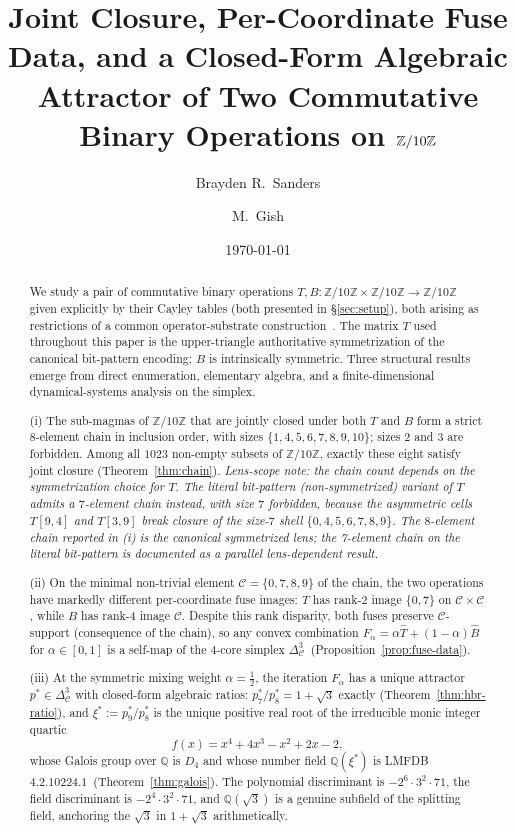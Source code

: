\documentclass[11pt,reqno]{amsart}
\title[Joint closure on $\Zten$]{Joint Closure, Per-Coordinate Fuse
Data, and a Closed-Form Algebraic Attractor of Two Commutative Binary
Operations on $\Zten$}
\author{Brayden R.\ Sanders}
\author{M.\ Gish}
\date{\today}
\theoremstyle{plain}
\theoremstyle{definition}
\theoremstyle{remark}
\newcommand{\Z}{\mathbb{Z}}
\newcommand{\Q}{\mathbb{Q}}
\newcommand{\Zten}{\Z/10\Z}
\newcommand{\Cfour}{\mathcal{C}}
\newcommand{\Tfuse}{\widehat{T}}
\newcommand{\Bfuse}{\widehat{B}}
\begin{document}
\begin{abstract}
We study a pair of commutative binary operations
$T,B:\Zten\times\Zten\to\Zten$ given explicitly by their Cayley
tables (both presented in \S\ref{sec:setup}), both arising as restrictions of a common operator-substrate
construction~\cite{SandersGish2026Sigma}. The matrix $T$ used throughout this paper is the upper-triangle authoritative symmetrization of the canonical bit-pattern encoding; $B$ is intrinsically symmetric. Three structural results
emerge from direct enumeration, elementary algebra, and a
finite-dimensional dynamical-systems analysis on the simplex.

(i) The sub-magmas of $\Zten$ that are jointly closed under both
$T$ and $B$ form a strict $8$-element chain in inclusion order,
with sizes $\{1, 4, 5, 6, 7, 8, 9, 10\}$; sizes $2$ and $3$ are
forbidden. Among all $1023$ non-empty subsets of $\Zten$, exactly
these eight satisfy joint closure (Theorem~\ref{thm:chain}). \emph{Lens-scope note: the chain count depends on the symmetrization choice for $T$. The literal bit-pattern (non-symmetrized) variant of $T$ admits a $7$-element chain instead, with size $7$ forbidden, because the asymmetric cells $T[9,4]$ and $T[3,9]$ break closure of the size-$7$ shell $\{0,4,5,6,7,8,9\}$. The $8$-element chain reported in (i) is the canonical symmetrized lens; the 7-element chain on the literal bit-pattern is documented as a parallel lens-dependent result.}

(ii) On the minimal non-trivial element $\Cfour=\{0,7,8,9\}$ of
the chain, the two operations have markedly different
per-coordinate fuse images: $T$ has rank-$2$ image $\{0, 7\}$ on
$\Cfour\times\Cfour$, while $B$ has rank-$4$ image $\Cfour$.
Despite this rank disparity, both fuses preserve $\Cfour$-support
(consequence of the chain), so any convex combination
$F_\alpha = \alpha\Tfuse + (1-\alpha)\Bfuse$ for $\alpha\in[0,1]$
is a self-map of the $4$-core simplex
$\Delta^{3}_{\Cfour}$~(Proposition~\ref{prop:fuse-data}).

(iii) At the symmetric mixing weight $\alpha=\tfrac12$, the
iteration $F_\alpha$ has a unique attractor
$p^*\in\Delta^{3}_{\Cfour}$ with closed-form algebraic ratios:
$p^*_{7}/p^*_{8}=1+\sqrt{3}$ exactly
(Theorem~\ref{thm:hbr-ratio}), and $\xi^*:=p^*_{9}/p^*_{8}$ is
the unique positive real root of the irreducible monic integer
quartic
\[
  f(x) = x^{4}+4x^{3}-x^{2}+2x-2,
\]
whose Galois group over $\Q$ is $D_{4}$ and whose number field
$\Q(\xi^*)$ is LMFDB~$4.2.10224.1$~(Theorem~\ref{thm:galois}).
The polynomial discriminant is
$-2^{6}\cdot 3^{2}\cdot 71$, the field discriminant is
$-2^{4}\cdot 3^{2}\cdot 71$, and $\Q(\sqrt{3})$ is a genuine
subfield of the splitting field, anchoring the $\sqrt{3}$ in
$1+\sqrt{3}$ arithmetically.


\end{abstract}
\end{document}
